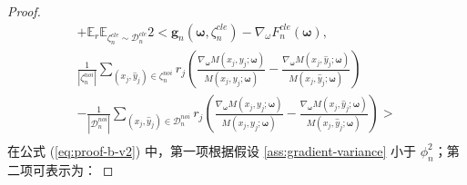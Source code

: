 \begin{proof}
\begin{multline}
+\mathbb{E}_{r}\mathbb{E}_{\zeta_n^{cle}\sim \mathcal{D}_n^{cle}}2<\boldsymbol{g}_n\left(\boldsymbol{\omega},\zeta_n^{cle}\right)-\nabla_\omega  F_n^{cle}\left(\boldsymbol{\omega}\right),\\
    \frac{1}{|\zeta_n^{noi}|}\sum_{\left(x_j,\hat{y}_j\right)\in \zeta_n^{noi}}r_j\left(\frac{\nabla_{\boldsymbol{\omega}} M\left(x_j, y_j; \boldsymbol{\omega}\right)}{M\left(x_j, y_j; \boldsymbol{\omega}\right)} -\frac{\nabla_{\boldsymbol{\omega}} M\left(x_j, \hat{y}_j; \boldsymbol{\omega}\right)}{M\left(x_j, \hat{y}_j; \boldsymbol{\omega}\right)}\right)\\
    -\frac{1}{|\mathcal{D}_n^{noi}|}\sum_{\left(x_j,\hat{y}_j\right)\in \mathcal{D}_n^{noi}}r_j\left(\frac{\nabla_{\boldsymbol{\omega}} M\left(x_j, y_j; \boldsymbol{\omega}\right)}{M\left(x_j, y_j; \boldsymbol{\omega}\right)} -\frac{\nabla_{\boldsymbol{\omega}} M\left(x_j, \hat{y}_j; \boldsymbol{\omega}\right)}{M\left(x_j, \hat{y}_j; \boldsymbol{\omega}\right)}\right)>\\
\end{multline}
在公式 (\ref{eq:proof-b-v2}) 中，第一项根据假设 \ref{ass:gradient-variance} 小于 $\phi^2_n$；第二项可表示为：


\end{proof}
